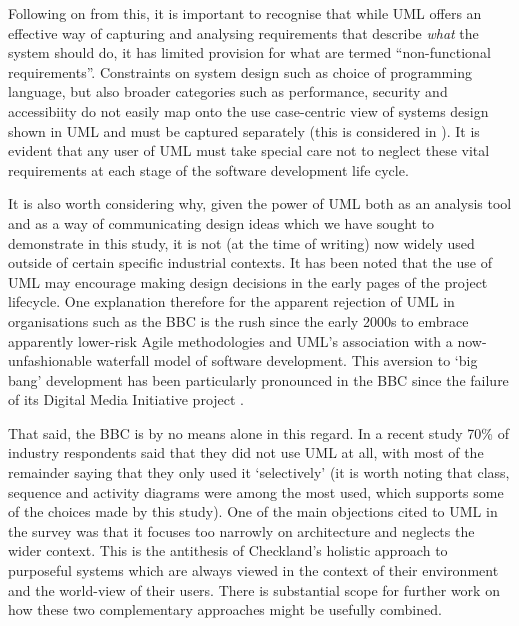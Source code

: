 \documentclass[runningheads,a4paper]{llncs}
\begin{document}
Following on from this, it is important to recognise that while UML offers an effective way of capturing and analysing requirements that describe \textit{what} the system should do, it has limited provision for what are termed ``non-functional requirements''. Constraints on system design such as choice of programming language, but also broader categories such as performance, security and accessibiity do not easily map onto the use case-centric view of systems design shown in UML and must be captured separately (this is considered in \cite{arlow}). It is evident that any user of UML must take special care not to neglect these vital requirements at each stage of the software development life cycle.

It is also worth considering why, given the power of UML both as an analysis tool and as a way of communicating design ideas which we have sought to demonstrate in this study, it is not (at the time of writing) now widely used outside of certain specific industrial contexts. It has been noted \cite{fenning} that the use of UML may encourage making design decisions in the early pages of the project lifecycle. One explanation therefore for the apparent rejection of UML in organisations such as the BBC is the rush since the early 2000s to embrace apparently lower-risk Agile methodologies and UML's association with a now-unfashionable waterfall model of software development. This aversion to `big bang' development has been particularly pronounced in the BBC since the failure of its Digital Media Initiative project \cite{bbc2011}.

That said, the BBC is by no means alone in this regard. In a recent study \cite{petre} 70\% of industry respondents said that they did not use UML at all, with most of the remainder saying that they only used it `selectively' (it is worth noting that class, sequence and activity diagrams were among the most used, which supports some of the choices made by this study). One of the main objections cited to UML in the survey was that it focuses too narrowly on architecture and neglects the wider context. This is the antithesis of Checkland's holistic approach to purposeful systems which are always viewed in the context of their environment and the world-view of their users. There is substantial scope for further work on how these two complementary approaches might be usefully combined.
\end{document}
